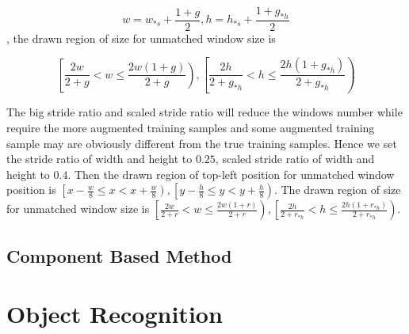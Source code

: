 \documentclass[runningheads,openany]{xhlPaper}
\begin{document}
\begin{displaymath}
w = {w_{*s}} + \frac{{1 + g}}{2}, h = {h_{*s}} + \frac{{1 + g_{*h}}}{2}
\end{displaymath}
, the drawn region of size for unmatched window size is 

\begin{displaymath}
\left[\frac{{2w}}{{2 + g}} < w \le \frac{{2w\left( {1 + g} \right)}}{{2 + g}}\right), \left[\frac{{2h}}{{2 + g_{*h}}} < h \le \frac{{2h\left( {1 + g_{*h}} \right)}}{{2 + g_{*h}}}\right)
\end{displaymath}

The big stride ratio and scaled stride ratio will reduce the windows number while require the more augmented training samples and some augmented training sample may are obviously different from the true training samples.
Hence we set the stride ratio of width and height to $0.25$, scaled stride ratio of width and height to $0.4$.
Then the drawn region of top-left position for unmatched window position is $\left[ {x- \frac{{w}}{8}} \le x < x + \frac{{w}}{8} \right), \left[y - \frac{{h}}{8} \le y < y + \frac{{h}}{8}\right)$. 
The drawn region of size for unmatched window size is $\left[\frac{{2w}}{{2 + r}} < w \le \frac{{2w\left( {1 + r} \right)}}{{2 + r}}\right), \left[\frac{{2h}}{{2 + r_{*h}}} < h \le \frac{{2h\left( {1 + r_{*h}} \right)}}{{2 + r_{*h}}}\right)$.

\subsection{Component Based Method}
\section{Object Recognition}



\end{document}
